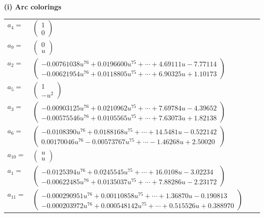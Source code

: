 \documentclass[1p]{elsarticle_modified}
\theoremstyle{definition}
\begin{document}
\flushleft \textbf{(i) Arc colorings}\\
\begin{tabular}{m{7pt} m{180pt} m{7pt} m{180pt} }
\flushright $a_{4}=$&$\begin{pmatrix}1\\0\end{pmatrix}$ \\
\flushright $a_{9}=$&$\begin{pmatrix}0\\u\end{pmatrix}$ \\
\flushright $a_{2}=$&$\begin{pmatrix}-0.00761038 u^{76}+0.0196600 u^{75}+\cdots+4.69111 u-7.77114\\-0.00621954 u^{76}+0.0118805 u^{75}+\cdots+6.90325 u+1.10173\end{pmatrix}$ \\
\flushright $a_{5}=$&$\begin{pmatrix}1\\- u^2\end{pmatrix}$ \\
\flushright $a_{3}=$&$\begin{pmatrix}-0.00903125 u^{76}+0.0210962 u^{75}+\cdots+7.69784 u-4.39652\\-0.00575546 u^{76}+0.0105565 u^{75}+\cdots+7.63073 u+1.82138\end{pmatrix}$ \\
\flushright $a_{6}=$&$\begin{pmatrix}-0.0108390 u^{76}+0.0188168 u^{75}+\cdots+14.5481 u-0.522142\\0.00170046 u^{76}-0.00573767 u^{75}+\cdots-1.46268 u+2.50020\end{pmatrix}$ \\
\flushright $a_{10}=$&$\begin{pmatrix}u\\u\end{pmatrix}$ \\
\flushright $a_{1}=$&$\begin{pmatrix}-0.0125394 u^{76}+0.0245545 u^{75}+\cdots+16.0108 u-3.02234\\-0.00622485 u^{76}+0.0135037 u^{75}+\cdots+7.88286 u-2.23172\end{pmatrix}$ \\
\flushright $a_{11}=$&$\begin{pmatrix}-0.000290951 u^{76}+0.00110858 u^{75}+\cdots+1.36870 u-0.190813\\-0.000203972 u^{76}+0.000548142 u^{75}+\cdots+0.515526 u+0.388970\end{pmatrix}$ \\

\end{tabular}
\end{document}
